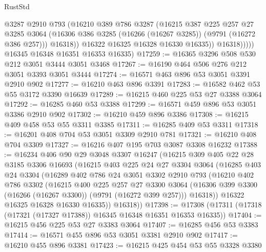 \begin{lexlean}{RustStd}
\begin{coremodule}
                    @3287
                    @2910
                    @793
                    (@16210
                      @389
                      @786
                      @3287
                      (@16215
                        @387
                        @225
                        @257
                        @27
                        @3285
                        @3064
                        (@16306 @386 @3285 (@16266 (@16267 @3285)) (@9791 (@16272 @386 @257)))
                        @16318))
                    @16322
                    @16325
                    @16328
                    @16330
                    @16335))
                @16318)))))
      @16345
      @16348
      @16351
      @16353
      @16335)
@17259 := @16365 @3296 @508 @530 @212 @3051 @3444 @3051 @3468
@17267 := @16190 @464 @506 @276 @212 @3051 @3393 @3051 @3444
@17274 := @16571 @463 @896 @53 @3051 @3391 @2910 @902
@17277 := @16210 @463 @896 @3391
@17283 := @16582 @462 @53 @55 @3172 @3390 @16639
@17289 := @16215 @460 @225 @53 @27 @3388 @3064
@17292 := @16285 @460 @53 @3388
@17299 := @16571 @459 @896 @53 @3051 @3386 @2910 @902
@17302 := @16210 @459 @896 @3386
@17308 := @16215 @409 @458 @53 @55 @3311 @3385
@17311 := @16285 @409 @53 @3311
@17318 := @16201 @408 @704 @53 @3051 @3309 @2910 @781
@17321 := @16210 @408 @704 @3309
@17327 := @16216 @407 @195 @703 @3087 @3308 @16232
@17388 := @16234
    @406
    @90
    @29
    @3048
    @3307
    @16247
    (@16215
      @309
      @405
      @22
      @28
      @3185
      @3306
      @16693
      (@16215
        @403
        @225
        @24
        @27
        @3304
        @3064
        (@16285
          @403
          @24
          @3304
          (@16289
            @402
            @786
            @24
            @3051
            @3302
            @2910
            @793
            (@16210
              @402
              @786
              @3302
              (@16215
                @400
                @225
                @257
                @27
                @3300
                @3064
                (@16306 @399 @3300 (@16266 (@16267 @3300)) (@9791 (@16272 @399 @257)))
                @16318))
            @16322
            @16325
            @16328
            @16330
            @16335))
        @16318))
@17398 := @17308 (@17311 (@17318 (@17321 (@17327 @17388)) @16345 @16348 @16351 @16353 @16335))
@17404 := @16215 @456 @225 @53 @27 @3383 @3064
@17407 := @16285 @456 @53 @3383
@17414 := @16571 @455 @896 @53 @3051 @3381 @2910 @902
@17417 := @16210 @455 @896 @3381
@17423 := @16215 @425 @454 @53 @55 @3328 @3380

\end{coremodule}
\end{lexlean}
